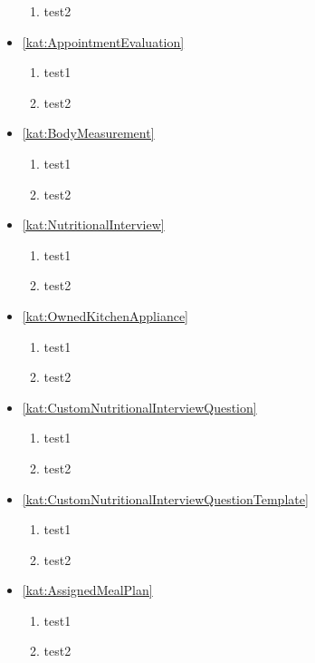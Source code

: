 \begin{itemize}[label={\textbf{Reguły dla}}, wide, labelwidth=!, labelindent=0pt]
\begin{enumerate}[label={\textbf{REG/\protect\threedigits{\arabic{enumi}}}}, wide, labelwidth=!, resume]
        \item test2
    \end{enumerate}
    \item\ref{kat:AppointmentEvaluation}
    \begin{enumerate}[label={\textbf{REG/\protect\threedigits{\arabic{enumi}}}}, wide, labelwidth=!, resume]
        \item test1
        \item test2
    \end{enumerate}
    \item\ref{kat:BodyMeasurement}
    \begin{enumerate}[label={\textbf{REG/\protect\threedigits{\arabic{enumi}}}}, wide, labelwidth=!, resume]
        \item test1
        \item test2
    \end{enumerate}
    \item\ref{kat:NutritionalInterview}
    \begin{enumerate}[label={\textbf{REG/\protect\threedigits{\arabic{enumi}}}}, wide, labelwidth=!, resume]
        \item test1
        \item test2
    \end{enumerate}
    \item\ref{kat:OwnedKitchenAppliance}
    \begin{enumerate}[label={\textbf{REG/\protect\threedigits{\arabic{enumi}}}}, wide, labelwidth=!, resume]
        \item test1
        \item test2
    \end{enumerate}
    \item\ref{kat:CustomNutritionalInterviewQuestion}
    \begin{enumerate}[label={\textbf{REG/\protect\threedigits{\arabic{enumi}}}}, wide, labelwidth=!, resume]
        \item test1
        \item test2
    \end{enumerate}
    \item\ref{kat:CustomNutritionalInterviewQuestionTemplate}
    \begin{enumerate}[label={\textbf{REG/\protect\threedigits{\arabic{enumi}}}}, wide, labelwidth=!, resume]
        \item test1
        \item test2
    \end{enumerate}
    \item\ref{kat:AssignedMealPlan}
    \begin{enumerate}[label={\textbf{REG/\protect\threedigits{\arabic{enumi}}}}, wide, labelwidth=!, resume]
        \item test1
        \item test2
    \end{enumerate}
\end{itemize}

